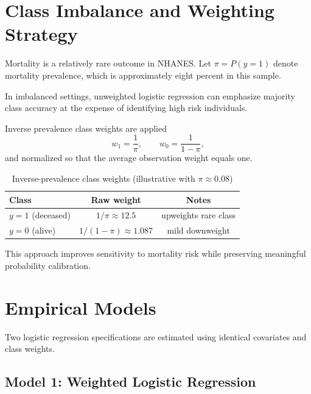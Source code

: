\documentclass[12pt]{article}
\begin{document}
\FloatBarrier

\section{Class Imbalance and Weighting Strategy}

Mortality is a relatively rare outcome in NHANES. Let $\pi = P(y = 1)$ denote mortality prevalence, which is approximately eight percent in this sample.

In imbalanced settings, unweighted logistic regression can emphasize majority class accuracy at the expense of identifying high risk individuals.

Inverse prevalence class weights are applied
\begin{equation}
w_1 = \frac{1}{\pi},
\qquad
w_0 = \frac{1}{1 - \pi},
\end{equation}
and normalized so that the average observation weight equals one.

\begin{table}[H]
\centering
\caption{Inverse-prevalence class weights (illustrative with $\pi \approx 0.08$)}
\begin{tabular}{lcc}
\toprule
Class & Raw weight & Notes \\
\midrule
$y=1$ (deceased) & $1/\pi \approx 12.5$ & upweights rare class \\
$y=0$ (alive)    & $1/(1-\pi) \approx 1.087$ & mild downweight \\
\bottomrule
\end{tabular}
\end{table}

This approach improves sensitivity to mortality risk while preserving meaningful probability calibration.

\FloatBarrier

\section{Empirical Models}

Two logistic regression specifications are estimated using identical covariates and class weights.

\subsection{Model 1: Weighted Logistic Regression}
\end{document}

